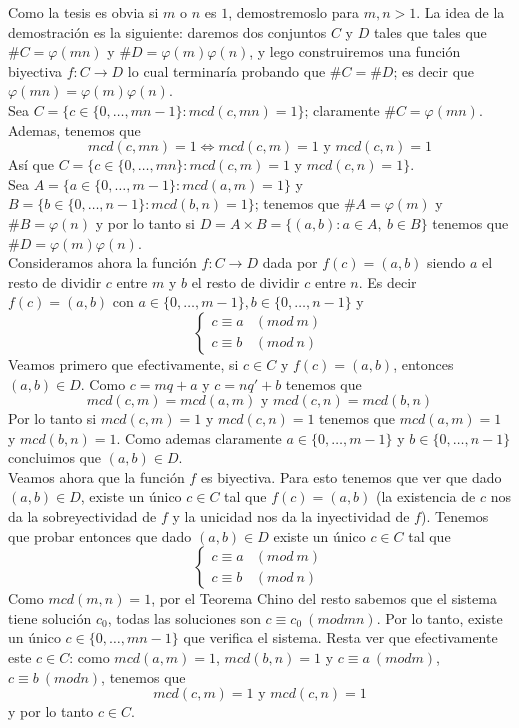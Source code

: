 \documentclass{report}
\begin{document}
\begin{myproof}
    Como la tesis es obvia si $m$ o $n$ es $1$, demostremoslo para $m,n>1$. La idea de la demostración es la siguiente: daremos dos conjuntos $C$ y $D$ tales que tales que $\#C=\varphi(mn)$ y $\#D=\varphi(m)\varphi(n)$, y lego construiremos una función biyectiva $f:C\to D$ lo cual terminaría probando que $\#C=\#D$; es decir que $\varphi(mn)=\varphi(m)\varphi(n)$.\\
    Sea $C=\{c\in\{0,\dots,mn-1\}:mcd(c,mn)=1\}$; claramente $\#C=\varphi(mn)$. Ademas, tenemos que $$mcd(c,mn)=1\Leftrightarrow mcd(c,m)=1\text{ y }mcd(c,n)=1$$Así que $C=\{c\in\{0,\dots,mn\}:mcd(c,m)=1$ y $mcd(c,n)=1\}$.\\
    Sea $A=\{a\in\{0,\dots,m-1\}:mcd(a,m)=1\}$ y $B=\{b\in\{0,\dots,n-1\}:mcd(b,n)=1\}$; tenemos que $\#A=\varphi(m)$ y $\#B=\varphi(n)$ y por lo tanto si $D=A\times B=\{(a,b):a\in A,\ b\in B\}$ tenemos que $\#D=\varphi(m)\varphi(n)$.\\Consideramos ahora la función $f:C\to D$ dada por $f(c)=(a,b)$ siendo $a$ el resto de dividir $c$ entre $m$ y $b$ el resto de dividir $c$ entre $n$. Es decir $f(c)=(a,b)$ con $a\in\{0,\dots,m-1\}, b\in\{0,\dots,n-1\}$ y $$\begin{cases} c\equiv a & ( mod\ m)\\ c\equiv b & ( mod\ n) \end{cases}$$Veamos primero que efectivamente, si $c\in C$ y $f(c)=(a,b)$, entonces $(a,b)\in D$. Como $c=mq+a$ y $c=nq'+b$ tenemos que$$mcd(c,m)=mcd(a,m)\text{ y } mcd(c,n)=mcd(b,n)$$Por lo tanto si $mcd(c,m)=1$ y $mcd(c,n)=1$ tenemos que $mcd(a,m)=1$ y $mcd(b,n)=1$. Como ademas claramente $a\in\{0,\dots,m-1\}$ y $b\in\{0,\dots,n-1\}$ concluimos que $(a,b)\in D$.\\Veamos ahora que la función $f$ es biyectiva. Para esto tenemos que ver que dado $(a,b)\in D$, existe un único $c\in C$ tal que $f(c)=(a,b)$ (la existencia de $c$ nos da la sobreyectividad de $f$ y la unicidad nos da la inyectividad de $f$). Tenemos que probar entonces que dado $(a,b)\in D$ existe un único $c\in C$ tal que$$\begin{cases} c\equiv a & ( mod\ m)\\ c\equiv b & ( mod\ n) \end{cases}$$Como $mcd(m,n)=1$, por el Teorema Chino del resto sabemos que el sistema tiene solución $c_0$, todas las soluciones son $c\equiv c_0\ (mod mn)$. Por lo tanto, existe un único $c\in\{0,\dots,mn-1\}$ que verifica el sistema. Resta ver que efectivamente este $c\in C$: como $mcd(a,m)=1$, $mcd(b,n)=1$ y $c\equiv a\ (mod m)$, $c\equiv b\ (mod n)$, tenemos que $$mcd(c,m)=1\text{ y }mcd(c,n)=1$$y por lo tanto $c\in C$.
\end{myproof}
\end{document}
